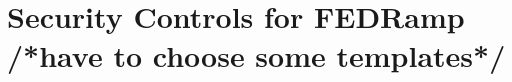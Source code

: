 \documentclass[../main.tex]{subfiles}
\begin{document}
\chapter{Security Controls for FEDRamp /*have to choose some templates*/} 
\end{document}
